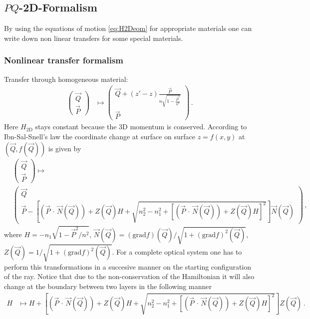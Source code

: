 \documentclass[12pt,a4paper,twoside,openright,BCOR10mm,headsepline,titlepage,abstracton,chapterprefix,final]{scrreprt}
\newcommand{\scpm}[2]{(#1\,\cdot\,#2)}
\begin{document}
\subsection{$PQ$-2D-Formalism}

By using the equations of motion \eqref{eq:H2Deom} for appropriate materials one can write down non linear transfers for
some special materials.

\subsubsection{Nonlinear transfer formalism}

Transfer through homogeneous material:
\begin{align}
 \begin{pmatrix}
  \vec{Q} \\
  \vec{P}
 \end{pmatrix} &\mapsto
 \begin{pmatrix}
  \vec{Q} + (z' -z) \frac{\vec{P}}{n \sqrt{1 - \frac{\vec{P}^2}{n^2}}} \\
  \vec{P}
 \end{pmatrix}\,.
\end{align}
Here $H_{\text{2D}}$ stays constant because the 3D momentum is conserved.
According to Ibn-Sal-Snell's law the coordinate change at surface on surface $z = f(x,y)$ at $(\vec{Q} , f(\vec{Q}))$ is given by
\begin{align}
 &\begin{pmatrix}
  \vec{Q} \\
  \vec{P}
 \end{pmatrix} \mapsto\nonumber\\&
 \begin{pmatrix}
  \vec{Q} \\
  \vec{P} - \left[\scpm{\vec{P}}{\vec{N}(\vec{Q})} + Z(\vec{Q}) H + \sqrt{n_2^2 - n_1^2 + [\scpm{\vec{P}}{\vec{N}(\vec{Q})} + Z(\vec{Q})H]^2}\right] \vec{N}(\vec{Q})
 \end{pmatrix}\,,
\end{align}
where $H = -n_1 \sqrt{1 - \vec{P}^2/n^2}$, 
$\vec{N}(\vec{Q}) = (\text{grad} f)(\vec{Q})/\sqrt{1 + (\text{grad} f)^2(\vec{Q})}$, 
$Z(\vec{Q}) = 1/\sqrt{1 + (\text{grad} f)^2(\vec{Q})}$.
For a complete optical system one has to perform this transformations in a succesive manner on the starting configuration of the ray.
Notice that due to the non-conservation of the Hamiltonian it will also change at the boundary between two layers in the following manner
\begin{align}
 H &\mapsto H + \left[\scpm{\vec{P}}{\vec{N}(\vec{Q})} + Z(\vec{Q}) H + \sqrt{n_2^2 - n_1^2 + [\scpm{\vec{P}}{\vec{N}(\vec{Q})} + Z(\vec{Q})H]^2}\right] Z(\vec{Q})\,.
\end{align}
\end{document}
